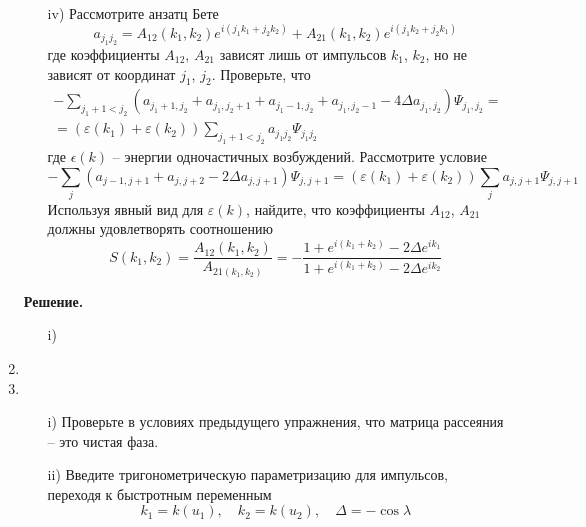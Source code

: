 \documentclass[12pt]{article}
\theoremstyle{definition}
\begin{document}
\begin{enumerate}
\begin{itemize}
\begin{multline}
        \end{multline}
        \item[iv)] Рассмотрите анзатц Бете
        \begin{equation}
            a_{j_1j_2}=A_{12}(k_1,k_2)e^{i(j_1k_1+j_2k_2)}+A_{21}(k_1,k_2)e^{i(j_1k_2+j_2k_1)}
        \end{equation}
        где коэффициенты $A_{12}$, $A_{21}$ зависят лишь от импульсов $k_1$, $k_2$, но не зависят от координат $j_1$, $j_2$. Проверьте, что
        \begin{multline}
            -\sum\limits_{j_1+1<j_2}(a_{j_1+1,j_2}+a_{j_1,j_2+1}+a_{j_1-1,j_2}+a_{j_1,j_2-1}-4\Delta a_{j_1,j_2})\Psi_{j_1,j_2}=\\=(\varepsilon(k_1)+\varepsilon(k_2))\sum\limits_{j_1+1<j_2}a_{j_1j_2}\Psi_{j_1j_2}
        \end{multline}
        где $\epsilon(k)$ -- энергии одночастичных возбуждений. Рассмотрите условие
        \begin{equation}
            -\sum\limits_j(a_{j-1,j+1}+a_{j,j+2}-2\Delta a_{j,j+1})\Psi_{j,j+1}=(\varepsilon(k_1)+\varepsilon(k_2))\sum\limits_ja_{j,j+1}\Psi_{j,j+1}
        \end{equation}
        Используя явный вид для $\varepsilon(k)$, найдите, что коэффициенты $A_{12}$, $A_{21}$ должны удовлетворять соотношению
        \begin{equation}
            S(k_1,k_2)=\frac{A_{12}(k_1,k_2)}{A_{21(k_1,k_2)}}=-\frac{1+e^{i(k_1+k_2)}-2\Delta e^{ik_1}}{1+e^{i(k_1+k_2)}-2\Delta e^{ik_2}}
        \end{equation}
    \end{itemize}
    \textbf{Решение.}
    \begin{itemize}
        \item[i)] 
    \end{itemize}
    \item
    \item
    \begin{itemize}
        \item[i)] Проверьте в условиях предыдущего упражнения, что матрица рассеяния -- это чистая фаза.
        \item[ii)] Введите тригонометрическую параметризацию для импульсов, переходя к быстротным переменным
        \begin{equation}
            k_1=k(u_1),\quad k_2=k(u_2),\quad \Delta=-\cos\lambda
        \end{equation}
        \begin{equation}

\end{equation}
\end{itemize}
\end{enumerate}
\end{document}
